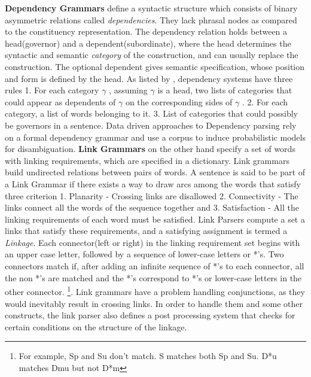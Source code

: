 \documentclass[runningheads,a4paper,11pt]{llncs}
\begin{document}
 \textbf{Dependency Grammars} define a syntactic structure which consists of binary asymmetric relations called \textit{dependencies}. They lack phrasal nodes as compared to the 
 constituency representation. The dependency relation holds between a head(governor) and a dependent(subordinate), where the head determines the syntactic and 
 semantic \textit{category} of the construction, and can usually replace the construction. The optional dependent gives semantic specification, whose position and form 
 is defined by the head. As listed by \cite{DBLP:journals/corr/abs-cmp-lg-9508004}, dependency systems have three rules 1. For each category $\gamma$ , assuming $\gamma$  is a head, two lists of categories that could appear as 
 dependents of $\gamma$ on the corresponding sides of $\gamma$ . 2. For each category, a list of words belonging to it. 3. List of categories that could possibly be governors in a sentence.
 Data driven approaches to Dependency parsing rely on a formal dependency grammar and use a corpus to induce probabilistic models for disambiguation. \newline
 {\bf Link Grammars}\cite{Nivre05dependencygrammar} on the other hand specify a set of words with linking requirements, which are specified in a dictionary. Link grammars build undirected relations
 between pairs of words. A sentence is said to be part of a Link Grammar if there exists a way to draw arcs among the words that satisfy three criterion 1. Planarity - Crossing links 
 are disallowed
 2. Connectivity - The links connect all the words of the sequence together and 3. Satisfaction - All the linking requirements of each word must be satisfied. 
 Link Parsers compute a set a links that satisfy these requirements, and a satisfying assignment is termed a {\it Linkage}. Each connector(left or right) in the linking 
 requirement set begins with an upper case letter, followed by a sequence of lower-case letters or *'s. Two connectors match if, after adding an
 infinite sequence of *'s to each connector, all the non *'s are matched and the *'s correspond to *'s or lower-case letters in the other connector. \footnote{For example,
 Sp and Su don't match. S matches both Sp and Su. D*u matches Dmu but not D*m}. Link grammars have a problem handling conjunctions, as they would inevitably
 result in crossing links. In order to handle them and some other constructs, the link parser also defines a post processing system that checks for certain conditions
 on the structure of the linkage. \newline
\end{document}
